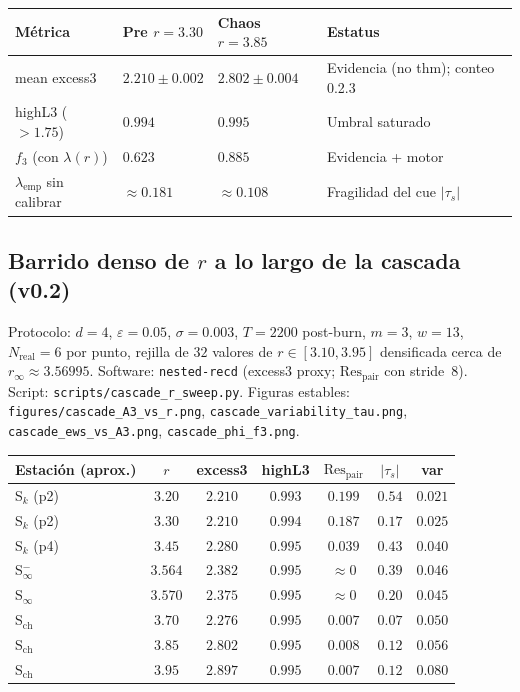\documentclass[11pt,a4paper]{article}
\theoremstyle{definition}
\theoremstyle{plain}
\theoremstyle{remark}
\newcommand{\Res}{\mathrm{Res}}
\newcommand{\ts}{\tau_s}
\begin{document}
\begin{center}
\begin{tabular}{@{}llll@{}}
\toprule
M\'etrica & Pre $r=3.30$ & Chaos $r=3.85$ & Estatus \\
\midrule
mean excess3 & $2.210\pm 0.002$ & $2.802\pm 0.004$ & Evidencia (no thm); conteo 0.2.3 \\
highL3 ($>1.75$) & $0.994$ & $0.995$ & Umbral saturado \\
$f_3$ (con $\lambda(r)$) & $0.623$ & $0.885$ & Evidencia + motor \\
$\lambda_{\mathrm{emp}}$ sin calibrar & $\approx 0.181$ & $\approx 0.108$ &
Fragilidad del cue $|\ts|$ \\
\bottomrule
\end{tabular}
\end{center}

\subsection{Barrido denso de $r$ a lo largo de la cascada (v0.2)}
\label{sec:sweep}

Protocolo: $d=4$, $\varepsilon=0.05$, $\sigma=0.003$, $T=2200$ post-burn,
$m=3$, $w=13$, $N_{\mathrm{real}}=6$ por punto, rejilla de $32$ valores de
$r\in[3.10,3.95]$ densificada cerca de $r_\infty\approx 3.56995$.
Software: \texttt{nested-recd} (excess3 proxy; $\Res_{\mathrm{pair}}$ con
stride~$8$). Script: \texttt{scripts/cascade\_r\_sweep.py}.
Figuras estables: \texttt{figures/cascade\_A3\_vs\_r.png},
\texttt{cascade\_variability\_tau.png}, \texttt{cascade\_ews\_vs\_A3.png},
\texttt{cascade\_phi\_f3.png}.

\begin{center}
\small
\begin{tabular}{@{}lcccccc@{}}
\toprule
Estaci\'on (aprox.) & $r$ & excess3 & highL3 & $\Res_{\mathrm{pair}}$ &
$|\ts|$ & var \\
\midrule
S$_k$ (p2) & $3.20$ & $2.210$ & $0.993$ & $0.199$ & $0.54$ & $0.021$ \\
S$_k$ (p2) & $3.30$ & $2.210$ & $0.994$ & $0.187$ & $0.17$ & $0.025$ \\
S$_k$ (p4) & $3.45$ & $2.280$ & $0.995$ & $0.039$ & $0.43$ & $0.040$ \\
S$_\infty^-$ & $3.564$ & $2.382$ & $0.995$ & $\approx 0$ & $0.39$ & $0.046$ \\
S$_\infty$ & $3.570$ & $2.375$ & $0.995$ & $\approx 0$ & $0.20$ & $0.045$ \\
S$_{\mathrm{ch}}$ & $3.70$ & $2.276$ & $0.995$ & $0.007$ & $0.07$ & $0.050$ \\
S$_{\mathrm{ch}}$ & $3.85$ & $2.802$ & $0.995$ & $0.008$ & $0.12$ & $0.056$ \\
S$_{\mathrm{ch}}$ & $3.95$ & $2.897$ & $0.995$ & $0.007$ & $0.12$ & $0.080$ \\
\bottomrule
\end{tabular}
\end{center}
\end{document}
